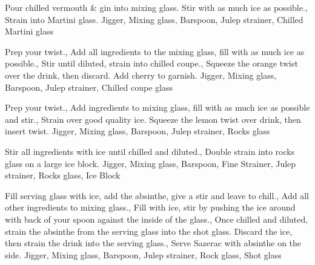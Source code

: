 \documentclass[../main.tex]{subfiles}
\begin{document}

    {
            {Pour chilled vermouth \& gin into mixing glass. Stir with as much ice as possible.},
            {Strain into Martini glass}.
    }
    {Jigger, Mixing glass, Barspoon, Julep strainer, Chilled Martini glass}


    \cocktailDivider

    {
            {Prep your twist.},
            {Add all ingredients to the mixing glass, fill with as much ice as possible.},
            {Stir until diluted, strain into chilled coupe.},
            {Squeeze the orange twist over the drink, then discard. Add cherry to garnish.}
    }
    {Jigger, Mixing glass, Barspoon, Julep strainer, Chilled coupe glass}

    \cocktailDivider

    {
        Prep your twist.,
            {Add ingredients to mixing glass, fill with as much ice as possible and stir.},
            {Strain over good quality ice.}
            {Squeeze the lemon twist over drink, then insert twist.}
    }
    {Jigger, Mixing glass, Barspoon, Julep strainer, Rocks glass}

    \clearpage

    {
        Stir all ingredients with ice until chilled and diluted.,
        Double strain into rocks glass on a large ice block.
    }
    {Jigger, Mixing glass, Barspoon, Fine Strainer, Julep strainer, Rocks glass, Ice Block}

    \cocktailDivider

    {
            {Fill serving glass with ice, add the absinthe, give a stir and leave to chill.},
            {Add all other ingredients to mixing glass.},
            {Fill with ice, stir by pushing the ice around with back of your spoon against the inside of the glass.},
            {Once chilled and diluted, strain the absinthe from the serving glass into the shot glass.
        Discard the ice, then strain the drink into the serving glass.},
            {Serve Sazerac with absinthe on the side.}
    }
    {Jigger, Mixing glass, Barspoon, Julep strainer, Rock glass, Shot glass}

    \clearpage
\end{document}
